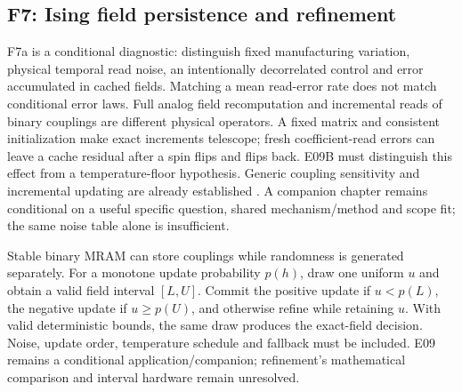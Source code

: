\subsection{F7: Ising field persistence and refinement}

F7a is a conditional diagnostic: distinguish fixed manufacturing variation, physical
temporal read noise, an intentionally decorrelated control and error accumulated in
cached fields. Matching a mean read-error rate does not match conditional error laws.
Full analog field recomputation and incremental reads of binary couplings are different
physical operators. A fixed matrix and consistent initialization make exact increments
telescope; fresh coefficient-read errors can leave a cache residual after a spin flips
and flips back. E09B must distinguish this effect from a temperature-floor hypothesis.
Generic coupling sensitivity and incremental updating are already established
\cite{S18,S32,S33}. A companion chapter remains conditional on a useful specific question,
shared mechanism/method and scope fit; the same noise table alone is insufficient.

Stable binary MRAM can store couplings while randomness is generated separately. For a
monotone update probability $p(h)$, draw one uniform $u$ and obtain a valid field interval
$[L,U]$. Commit the positive update if $u<p(L)$, the negative update if $u\ge p(U)$, and
otherwise refine while retaining $u$. With valid deterministic bounds, the same draw
produces the exact-field decision. Noise, update order, temperature schedule and fallback
must be included. E09 remains a conditional application/companion; refinement's
mathematical comparison and interval hardware remain unresolved.
